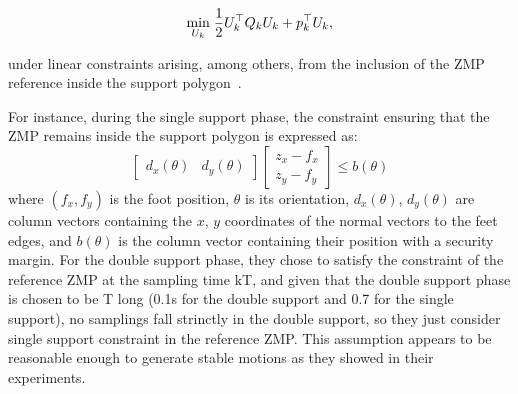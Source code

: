 \begin{equation}
 \underset{U_k}{\min} \; \dfrac{1}{2} U_k^{\top} Q_k U_k + p_k^{\top} U_k,
\label{Eq:QP}
\end{equation}

under linear constraints arising, among others, from the inclusion of the ZMP reference inside the support polygon~\citep{HerdtAR2010}.

For instance, during the single support phase, the constraint ensuring that the ZMP remains inside the support polygon is expressed as:
\begin{equation}
  \begin{bmatrix} d_x(\theta) & d_y(\theta) \end{bmatrix}
  \begin{bmatrix} z_x - f_x \\ z_y - f_y \end{bmatrix} \leq b(\theta)
\end{equation}
where $(f_x,f_y)$ is the foot position, $\theta$ is its orientation,
$d_x(\theta)$, $d_y(\theta)$ are column vectors containing the $x$,
$y$ coordinates of the normal vectors to the feet edges, and $b(\theta)$  is the column vector containing their position with a security margin. For the double support phase, they chose to satisfy the constraint of the reference ZMP at the sampling time kT, and given that the double support phase is chosen to be T long (0.1s for the double support and 0.7 for the single support), no samplings fall strinctly in the double support, so they just consider single support constraint in the reference ZMP. This assumption appears to be reasonable enough to generate stable motions as they showed in their experiments.